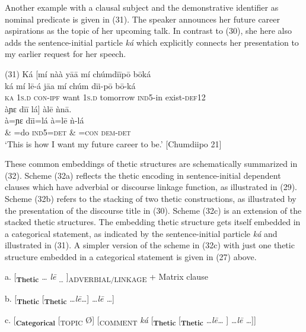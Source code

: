 \documentclass[output=paper]{langsci/langscibook}
\begin{document}
Another example with a clausal subject and the demonstrative identifier as nominal predicate is given in (31). The speaker announces her future career aspirations as the topic of her upcoming talk. In contrast to (30), she here also adds the sentence-initial particle \textit{ká }which explicitly connects her presentation to my earlier request for her speech.

\ea
\glll \textup{(31)}  Ká  \textup{[}mí    nàà    y\={a}\={a}    mí    chúmd\={i}\={i}p\={o}            b\={o}ká\\
  \textup{  ká   mí    l\={e}-á      j\={a}a    mí    chúm        d\={i}i-p\={o}    b\={o}-ká}\\
     \textsc{  ka}   1\textsc{s.d}  \textsc{con-ipf}    want  1\textsc{s}.\textsc{d  }tomorrow     \textsc{ind}5-in     exist-\textsc{def}12\\
\glll   àɲɛ    d\={i}\={i}   lá\textup{]    }àl\={e}    ǹn\={a}.\\
  \textup{  à=ɲɛ  d\={i}i=lá    à=l\={e}    ǹ-lá}\\
       \& =do  \textsc{ind}\textsc{5=}\textsc{det}\textsc{  \& =}\textsc{con}\textsc{  }\textsc{dem-det}\\
\glt ‘This is how I want my future career to be.’ [Chumdiipo 21]\\

\z

These common embeddings of thetic structures are schematically summarized in (32). Scheme (32a) reflects the thetic encoding in sentence-initial dependent clauses which have adverbial or discourse linkage function, as illustrated in (29). Scheme (32b) refers to the stacking of two thetic constructions, as illustrated by the presentation of the discourse title in (30). Scheme (32c) is an extension of the stacked thetic structures. The embedding thetic structure gets itself embedded in a categorical statement, as indicated by the sentence-initial particle \textit{ká }and illustrated in (31). A simpler version of the scheme in (32c) with just one thetic structure embedded in a categorical statement is given in (27) above. 

\ea
{a.  [\textbf{\textsubscript{Thetic}} \textit{… l\={e}}\textsubscript{ … }]\textsubscript{ADVERBIAL/LINKAGE} + Matrix clause }

    b.   [\textbf{\textsubscript{Thetic}}\textsubscript{  }[\textbf{\textsubscript{Thetic}} \textit{…l\={e}…}] \textit{…l\={e} …}]

    c.   [\textbf{\textsubscript{Categorical}}\textsubscript{ }[\textsubscript{TOPIC }Ø]\textsubscript{ }[\textsubscript{COMMENT}\textit{ ká} [\textbf{\textsubscript{Thetic}}\textsubscript{  }[\textbf{\textsubscript{Thetic}} \textit{…l\={e}… }] \textit{…l\={e} …}]]
\z
\end{document}
